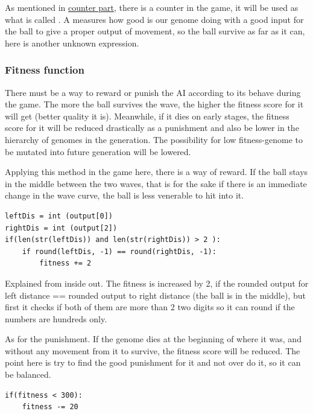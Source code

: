 As mentioned in \hyperref[display-score]{counter part}, there is a counter in the game, it will be used as what is called . A  measures how good is our genome doing with a good input for the ball to give a proper output of movement, so the ball survive as far as it can, here is another unknown expression.
 
\subsubsection{Fitness function}
There must be a way to reward or punish the AI according to its behave during the game. The more the ball survives the wave, the higher the fitness score for it will get (better quality it is). Meanwhile, if it dies on early stages, the fitness score for it will be reduced drastically as a punishment and also be lower in the hierarchy of genomes in the generation. The possibility for low fitness-genome to be mutated into future generation will be lowered.

Applying this method in the game here, there is a way of reward. If the ball stays in the middle between the two waves, that is for the sake if there is an immediate change in the wave curve, the ball is less venerable to hit into it.

\begin{listing}[H]
\begin{verbatim}
leftDis = int (output[0])
rightDis = int (output[2])
if(len(str(leftDis)) and len(str(rightDis)) > 2 ):
	if round(leftDis, -1) == round(rightDis, -1):
		fitness += 2
\end{verbatim}
\end{listing}

Explained from inside out. The fitness is increased by 2, if the rounded output for left distance == rounded output to right distance (the ball is in the middle), but first it checks if both of them are more than 2 two digits so it can round if the numbers are hundreds only.

As for the punishment. If the genome dies at the beginning of where it was, and without any movement from it to survive, the fitness score will be reduced. The point here is try to find the good punishment for it and not over do it, so it can be balanced.

\begin{listing}[H]
	\begin{verbatim}
if(fitness < 300):
	fitness -= 20
	\end{verbatim}
\end{listing}

